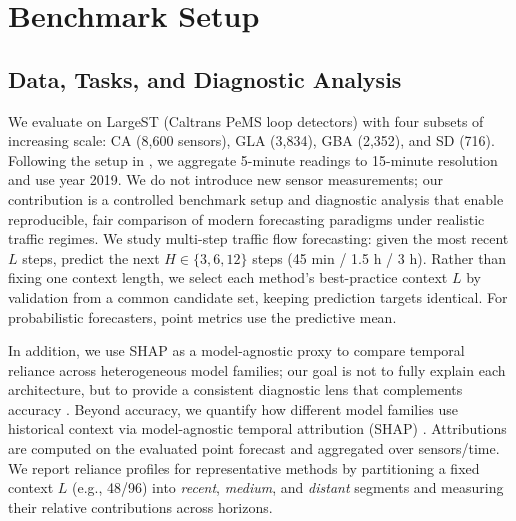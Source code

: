 \documentclass[10pt]{article}
\begin{document}



\section{Benchmark Setup}
\label{sec:setup}

\subsection{Data, Tasks, and Diagnostic Analysis}
We evaluate on {LargeST} (Caltrans PeMS loop detectors) \cite{liu2023largest} with four subsets of increasing
scale: CA (8,600 sensors), GLA (3,834), GBA (2,352), and SD (716). Following the  setup in \cite{liu2023largest},
we aggregate 5-minute readings to 15-minute resolution and use year 2019. We do not introduce new sensor measurements; our contribution is a controlled benchmark setup and
diagnostic analysis that enable reproducible, fair comparison of modern forecasting paradigms under realistic
traffic regimes.
We study multi-step traffic flow forecasting: given the most recent $L$ steps, predict the next
$H \in \{3,6,12\}$ steps (45 min / 1.5 h / 3 h). 
Rather than fixing one context length, we select each method's best-practice
context $L$ by validation from a common candidate set, keeping prediction targets identical. For probabilistic
forecasters, point metrics use the predictive mean. 

In addition, we use SHAP as a model-agnostic proxy to compare temporal reliance across heterogeneous model families; our goal is
not to fully explain each architecture, but to provide a consistent diagnostic lens that complements accuracy \cite{lundberg2017shap}. Beyond accuracy, we quantify how different model families use historical context via model-agnostic temporal
attribution (SHAP) \cite{lundberg2017shap}.  Attributions are computed on the evaluated point forecast and aggregated over
sensors/time. We report reliance profiles for representative methods by partitioning a fixed context $L$ (e.g., 48/96) into \textit{recent}, \textit{medium}, and
\textit{distant} segments and measuring their relative contributions across horizons.%
\end{document}
